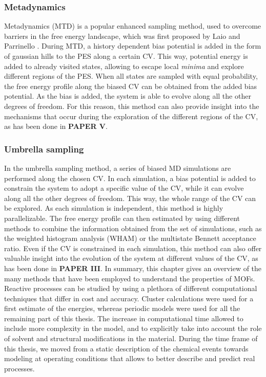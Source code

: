 \subsubsection*{Metadynamics}
Metadynamics (MTD) is a popular enhanced sampling method, used to overcome barriers in the free energy landscape, which was first proposed by Laio and Parrinello \cite{laio2002escaping, barducci2011metadynamics}. During MTD, a history dependent bias potential is added in the form of gaussian hills to the PES along a certain CV. This way, potential energy is added to already visited states, allowing to escape local \textit{minima} and explore different regions of the PES. When all states are sampled with equal probability, the free energy profile along the biased CV can be obtained from the added bias potential. As the bias is added, the system is able to evolve along all the other degrees of freedom. For this reason, this method can also provide insight into the mechanisms that occur during the exploration of the different regions of the CV, as has been done in \textbf{PAPER V}. 

\subsubsection*{Umbrella sampling}
In the umbrella sampling method, a series of biased MD simulations are performed along the chosen CV. In each simulation, a bias potential is added to constrain the system to adopt a specific value of the CV, while it can evolve along all the other degrees of freedom. This way, the whole range of the CV can be explored. As each simulation is independent, this method is highly parallelizable. The free energy profile can then estimated by using different methods to combine the information obtained from the set of simulations, such as the weighted histogram analysis (WHAM) or the multistate Bennett acceptance ratio\cite{kumar1992weighted, torrie1977nonphysical}. Even if the CV is constrained in each simulation, this method can also offer valuable insight into the evolution of the system at different values of the CV, as has been done in \textbf{PAPER III}.
\npar
\npar
\npar
\npar
\npar
In summary, this chapter gives an overview of the many methods that have been employed to understand the properties of MOFs. Reactive processes can be studied by using a plethora of different computational techniques that differ in cost and accuracy. Cluster calculations were used for a first estimate of the energies, whereas periodic models were used for all the remaining part of this thesis. The increase in computational time allowed to include more complexity in the model, and to explicitly take into account the role of solvent and structural modifications in the material. During the time frame of this thesis, we moved from a static description of the chemical events towards modeling at operating conditions that allows to better describe and predict real processes. 
\clearpage{\pagestyle{empty}\cleardoublepage}